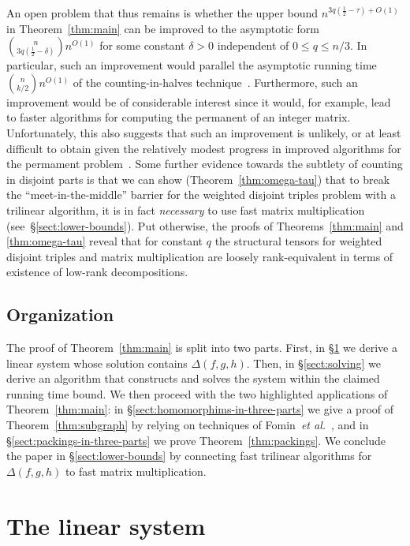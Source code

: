 \documentclass{amsart}
\begin{document}
An open problem that thus remains is whether the upper bound 
$n^{3q(\frac{1}{2}-\tau)+O(1)}$ in Theorem~\ref{thm:main}
can be improved to the asymptotic form 
$\binom{n}{3q(\frac{1}{2}-\delta)}n^{O(1)}$ for some constant $\delta>0$
independent of $0\leq q\leq n/3$. In particular, such an improvement would
parallel the asymptotic running time $\binom{n}{k/2}n^{O(1)}$ of the
counting-in-halves technique~\cite{BHKK09}. Furthermore, such an
improvement would be of considerable interest since it would, for example, 
lead to faster algorithms for computing the permanent of an 
integer matrix. Unfortunately, this also suggests that such an improvement
is unlikely, or at least difficult to obtain given the relatively 
modest progress in improved algorithms for the permament 
problem~\cite{Bjorklund12}. Some further evidence towards
the subtlety of counting in disjoint parts is that we can show
(Theorem~\ref{thm:omega-tau}) that to break the ``meet-in-the-middle'' 
barrier for the weighted disjoint triples problem with a trilinear 
algorithm, it is in fact {\em necessary} to use fast matrix multiplication 
(see~\S\ref{sect:lower-bounds}). Put otherwise, the proofs of
Theorems~\ref{thm:main} and \ref{thm:omega-tau} reveal that 
for constant $q$ the structural tensors for 
weighted disjoint triples and matrix multiplication are
loosely rank-equivalent in terms of existence of low-rank decompositions.

\subsection{Organization}

The proof of Theorem~\ref{thm:main} is split into two parts.
First, in \S\ref{sect:system} we derive a linear system whose
solution contains $\Delta(f,g,h)$. Then, in \S\ref{sect:solving}
we derive an algorithm that constructs and solves the system within the claimed
running time bound. We then proceed with the two highlighted
applications of Theorem~\ref{thm:main}: 
in \S\ref{sect:homomorphims-in-three-parts}
we give a proof of Theorem~\ref{thm:subgraph} by relying on techniques
of Fomin~{\em et al.}~\cite{FLRRS12}, and 
in \S\ref{sect:packings-in-three-parts} we prove Theorem~\ref{thm:packings}.
We conclude the paper in \S\ref{sect:lower-bounds} by connecting
fast trilinear algorithms for $\Delta(f,g,h)$ to fast matrix multiplication.


\section{The linear system}
\label{sect:system}
\end{document}
